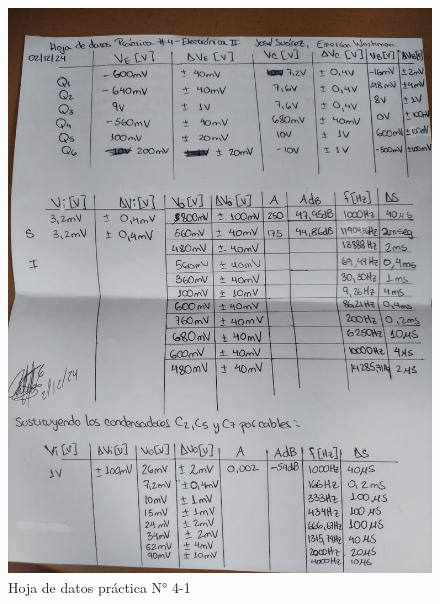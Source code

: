 \begin{figure}[ht]
    \centering
    \includegraphics[width=1.0\textwidth]{src/images/p4/p4-hoja-de-datos-1.jpg}
    \caption{Hoja de datos práctica N° 4-1}
    \label{fig:hoja-de-datos-p4-1}
\end{figure}

